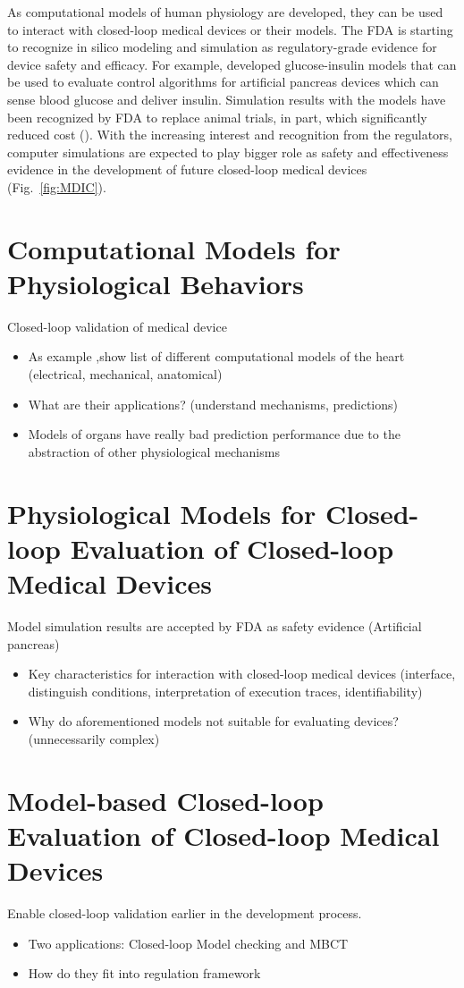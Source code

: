 \documentclass[a4paper]{article}
\newcommand{\figref}[1]{Fig.~\ref{fig:#1}}
\begin{document}
As computational models of human physiology are developed, they can be used to interact with closed-loop medical devices or their models. The FDA is starting to recognize in silico modeling and simulation as regulatory-grade evidence for device safety and efficacy. For example, \cite{pancreas_paul} developed glucose-insulin models that can be used to evaluate control algorithms for artificial pancreas devices which can sense blood glucose and deliver insulin. Simulation results with the models have been recognized by FDA to replace animal trials, in part, which significantly reduced cost (\cite{pancreas}). With the increasing interest and recognition from the regulators, computer simulations are expected to play bigger role as safety and effectiveness evidence in the development of future closed-loop medical devices (\figref{MDIC}).

\section{Computational Models for Physiological Behaviors}
Closed-loop validation of medical device
\begin{itemize}
	\item As example ,show list of different computational models of the heart (electrical, mechanical, anatomical)
	\item What are their applications? (understand mechanisms, predictions)
	\item Models of organs have really bad prediction performance due to the abstraction of other physiological mechanisms
\end{itemize}

\section{Physiological Models for Closed-loop Evaluation of Closed-loop Medical Devices}
Model simulation results are accepted by FDA as safety evidence (Artificial pancreas)
\begin{itemize}
	\item Key characteristics for interaction with closed-loop medical devices (interface, distinguish conditions, interpretation of execution traces, identifiability)
	\item Why do aforementioned models not suitable for evaluating devices? (unnecessarily complex)
\end{itemize}

\section{Model-based Closed-loop Evaluation of Closed-loop Medical Devices}
Enable closed-loop validation earlier in the development process.
\begin{itemize}
	\item Two applications: Closed-loop Model checking and MBCT
	\item How do they fit into regulation framework

\end{itemize}
\end{document}
